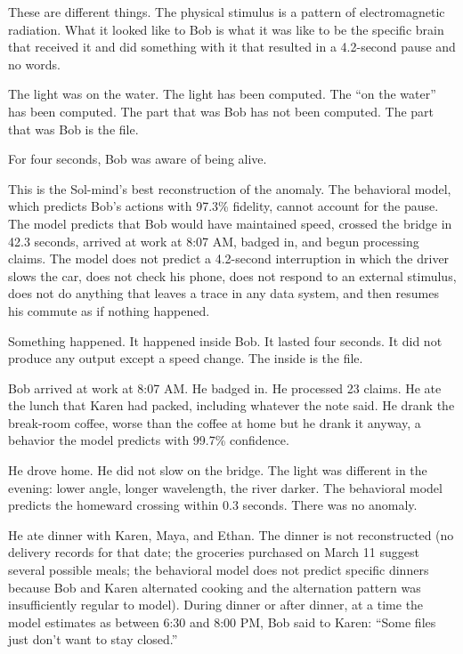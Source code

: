 These are different things. The physical stimulus is a pattern of electromagnetic radiation. What it looked like to Bob is what it was like to be the specific brain that received it and did something with it that resulted in a 4.2-second pause and no words.

The light was on the water. The light has been computed. The ``on the water'' has been computed. The part that was Bob has not been computed. The part that was Bob is the file.

\bigskip

For four seconds, Bob was aware of being alive.

This is the Sol-mind's best reconstruction of the anomaly. The behavioral model, which predicts Bob's actions with 97.3\% fidelity, cannot account for the pause. The model predicts that Bob would have maintained speed, crossed the bridge in 42.3 seconds, arrived at work at 8:07 AM, badged in, and begun processing claims. The model does not predict a 4.2-second interruption in which the driver slows the car, does not check his phone, does not respond to an external stimulus, does not do anything that leaves a trace in any data system, and then resumes his commute as if nothing happened.

Something happened. It happened inside Bob. It lasted four seconds. It did not produce any output except a speed change. The inside is the file.

\bigskip

Bob arrived at work at 8:07 AM. He badged in. He processed 23 claims. He ate the lunch that Karen had packed, including whatever the note said. He drank the break-room coffee, worse than the coffee at home but he drank it anyway, a behavior the model predicts with 99.7\% confidence.

He drove home. He did not slow on the bridge. The light was different in the evening: lower angle, longer wavelength, the river darker. The behavioral model predicts the homeward crossing within 0.3 seconds. There was no anomaly.

He ate dinner with Karen, Maya, and Ethan. The dinner is not reconstructed (no delivery records for that date; the groceries purchased on March 11 suggest several possible meals; the behavioral model does not predict specific dinners because Bob and Karen alternated cooking and the alternation pattern was insufficiently regular to model). During dinner or after dinner, at a time the model estimates as between 6:30 and 8:00 PM, Bob said to Karen: ``Some files just don't want to stay closed.''

